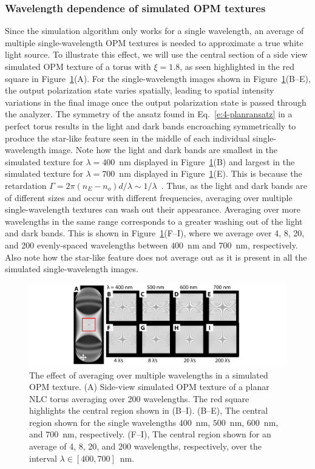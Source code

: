 \subsubsection{Wavelength dependence of simulated OPM textures}
Since the simulation algorithm only works for a single wavelength, an average of multiple single-wavelength OPM textures is needed to approximate a true white light source.
To illustrate this effect, we will use the central section of a side view simulated OPM texture of a torus with $\xi = 1.8$, as seen highlighted in the red square in Figure~\ref{fig_lambda}(A).
For the single-wavelength images shown in Figure~\ref{fig_lambda}(B--E), the output polarization state varies spatially, leading to spatial intensity variations in the final image once the output polarization state is passed through the analyzer.
The symmetry of the ansatz found in Eq.~\ref{e:4-planransatz} in a perfect torus results in the light and dark bands encroaching symmetrically to produce the star-like feature seen in the middle of each individual single-wavelength image.
Note how the light and dark bands are smallest in the simulated texture for $\lambda = 400 $~nm displayed in Figure~\ref{fig_lambda}(B) and largest in the simulated texture for $\lambda = 700$~nm displayed in Figure~\ref{fig_lambda}(E).
This is because the retardation $\Gamma = 2\pi(n_E-n_o)d/\lambda \sim 1/\lambda$~\cite{RN232}.
Thus, as the light and dark bands are of different sizes and occur with different frequencies, averaging over multiple single-wavelength textures can wash out their appearance.
Averaging over more wavelengths in the same range corresponds to a greater washing out of the light and dark bands.
This is shown in Figure~\ref{fig_lambda}(F--I), where we average over 4, 8, 20, and 200 evenly-spaced wavelengths between $400$~nm and $700$~nm, respectively.
Also note how the star-like feature does not average out as it is present in all the simulated single-wavelength images.
\begin{figure}
\centering
\includegraphics{figures/C4/Ch4-Figs_SimWavelengthAverage.png}
\caption{The effect of averaging over multiple wavelengths in a simulated OPM texture.
(A) Side-view simulated OPM texture of a planar NLC torus averaging over 200 wavelengths.
The red square highlights the central region shown in (B--I).
(B--E), The central region shown for the single wavelengths $400$~nm, $500$~nm, $600$~nm, and $700$~nm, respectively.
(F--I), The central region shown for an average of 4, 8, 20, and 200 wavelengths, respectively, over the interval $\lambda \in [400,700]$~nm.}\label{fig_lambda}
\end{figure}


